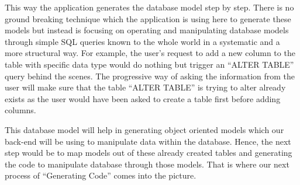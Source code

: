 \documentclass[letterpaper, 10 pt, conference]{ieeeconf}
\begin{document}
This way the application generates the database model step by step. There is no ground breaking technique which the application is using here to generate these models but instead is focusing on operating and manipulating database models through simple SQL queries known to the whole world in a systematic and a more structural way. For example, the user’s request to add a new column to the table with specific data type would do nothing but trigger an “ALTER TABLE” query behind the scenes. The progressive way of asking the information from the user will make sure that the table “ALTER TABLE” is trying to alter already exists as the user would have been asked to create a table first before adding columns.

This database model will help in generating object oriented models which our back-end will be using to manipulate data within the database. Hence, the next step would be to map models out of these already created tables and generating the code to manipulate database through those models. That is where our next process of “Generating Code” comes into the picture.
\end{document}
